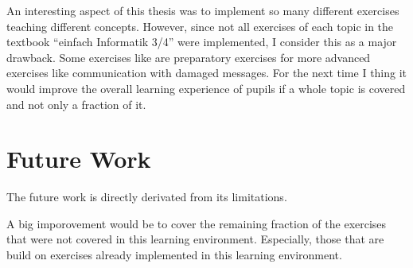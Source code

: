 An interesting aspect of this thesis was to implement so many different exercises teaching different concepts. However, since not all exercises of each topic in the textbook “einfach Informatik 3/4” were implemented, I consider this as a major drawback. Some exercises like  are preparatory exercises for more advanced exercises like communication with damaged messages. For the next time I thing it would improve the overall learning experience of pupils if a whole topic is covered and not only a fraction of it.


\section{Future Work}
\label{section:futureWork}

The future work is directly derivated from its limitations.

A big imporovement would be to cover the remaining fraction of the exercises that were not covered in this learning environment. Especially, those that are build on exercises already implemented in this learning environment.

